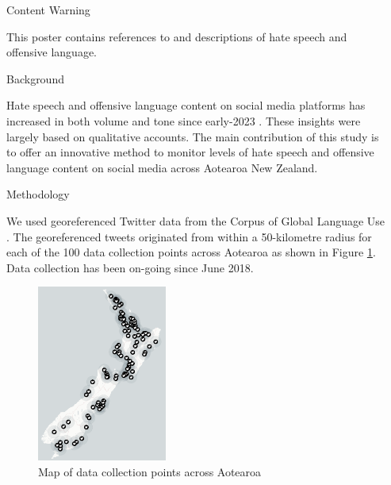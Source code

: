 \documentclass[final]{beamer}
\newlength{\sepwidth}
\newlength{\smallcolwidth}
\newcommand{\separatorcolumn}{\begin{column}{\sepwidth}\end{column}}
\begin{document}
\begin{frame}[t]
\begin{columns}[t]
\separatorcolumn

\begin{column}{\smallcolwidth}

    \begin{alertblock}{Content Warning}
  
   This poster contains references to and descriptions of hate speech and offensive language.

   \end{alertblock}
  
  \begin{block}{Background}
    
    Hate speech and offensive language content on social media platforms has increased in both volume and tone since early-2023 \cite{hattotuwa_transgressive_2023}. These insights were largely based on qualitative accounts. The main contribution of this study is to offer an innovative method to monitor levels of hate speech and offensive language content on social media across Aotearoa New Zealand.

  \end{block}
  
  \begin{block}{Methodology}

    We used georeferenced Twitter data from the Corpus of Global Language Use \cite{dunn_mapping_2020}. The georeferenced tweets originated from within a 50-kilometre radius for each of the 100 data collection points across Aotearoa as shown in Figure \ref{fig:1}. Data collection has been on-going since June 2018. 
  
    \begin{figure}
        \includegraphics[width=0.4\textwidth]{figures/map_aotearoa.png}
        \caption{Map of data collection points across Aotearoa}
        \label{fig:1}
    \end{figure}


\end{block}
\end{column}
\end{columns}
\end{frame}
\end{document}
